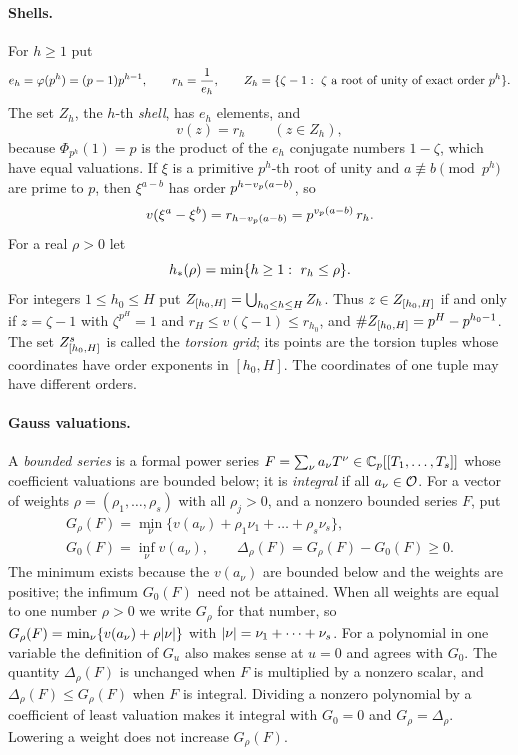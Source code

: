\paragraph{Shells.}
For $h\ge1$ put
\[
  e_h=\varphi(p^h)=(p-1)p^{h-1},\qquad r_h=\frac1{e_h},\qquad
  Z_h=\{\zeta-1:\ \zeta\text{ a root of unity of exact order }p^h\}.
\]
The set $Z_h$, the $h$-th \emph{shell}, has $e_h$ elements, and
\begin{equation}\label{tors:eq:shell}
  v(z)=r_h\qquad(z\in Z_h),
\end{equation}
because $\Phi_{p^h}(1)=p$ is the product of the $e_h$ conjugate numbers $1-\zeta$, which
have equal valuations. If $\xi$ is a primitive $p^h$-th root of unity and $a\not\equiv b
\pmod{p^h}$ are prime to $p$, then $\xi^{a-b}$ has order $p^{h-v_p(a-b)}$, so
\begin{equation}\label{tors:eq:distance}
  v(\xi^a-\xi^b)=r_{h-v_p(a-b)}=p^{v_p(a-b)}\,r_h .
\end{equation}
For a real $\rho>0$ let
\[
  h_*(\rho)=\min\set{h\ge1:\ r_h\le\rho}.
\]
For integers $1\le h_0\le H$ put $Z_{[h_0,H]}=\bigcup_{h_0\le h\le H}Z_h$. Thus
$z\in Z_{[h_0,H]}$ if and only if $z=\zeta-1$ with $\zeta^{p^H}=1$ and
$r_H\le v(\zeta-1)\le r_{h_0}$, and $\#Z_{[h_0,H]}=p^H-p^{h_0-1}$. The set
$Z_{[h_0,H]}^s$ is called the \emph{torsion grid}; its points are the torsion tuples
whose coordinates have order exponents in $[h_0,H]$. The coordinates of one tuple may have
different orders.

\paragraph{Gauss valuations.}
A \emph{bounded series} is a formal power series $F=\sum_\nu a_\nu T^\nu\in
\mathbb{C}_p[[T_1,\dots,T_s]]$ whose coefficient valuations are bounded below; it is \emph{integral}
if all $a_\nu\in\mathcal{O}$. For a vector of weights $\rho=(\rho_1,\dots,\rho_s)$ with all
$\rho_j>0$, and a nonzero bounded series $F$, put
\begin{gather*}
  G_\rho(F)=\min_\nu\bigl\{v(a_\nu)+\rho_1\nu_1+\dots+\rho_s\nu_s\bigr\},\\
  G_0(F)=\inf_\nu v(a_\nu),\qquad \Delta_\rho(F)=G_\rho(F)-G_0(F)\ge0 .
\end{gather*}
The minimum exists because the $v(a_\nu)$ are bounded below and the weights are positive;
the infimum $G_0(F)$ need not be attained. When all weights are equal to one number
$\rho>0$ we write $G_\rho$ for that number, so $G_\rho(F)=\min_\nu\{v(a_\nu)+\rho\lvert\nu\rvert\}$
with $\lvert\nu\rvert=\nu_1+\dots+\nu_s$. For a polynomial in one variable the definition of
$G_u$ also makes sense at $u=0$ and agrees with $G_0$. The quantity $\Delta_\rho(F)$ is
unchanged when $F$ is multiplied by a nonzero scalar, and $\Delta_\rho(F)\le G_\rho(F)$ when
$F$ is integral. Dividing a nonzero polynomial by a coefficient of least valuation makes it
integral with $G_0=0$ and $G_\rho=\Delta_\rho$. Lowering a weight does not increase
$G_\rho(F)$.

